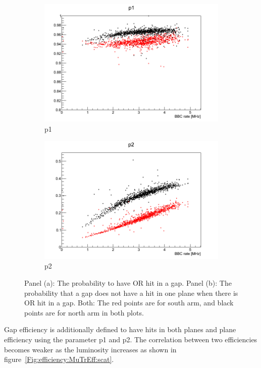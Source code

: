 \begin{figure}
  \centering
	\begin{subfigure}{0.5\textwidth}
		\centering
		\includegraphics[width=0.9\linewidth]{./figures/mutr_hiteff_run13_p1.png}
		\caption{p1}
	\end{subfigure}%
	\begin{subfigure}{0.5\textwidth}
		\centering
		\includegraphics[width=0.9\linewidth]{./figures/mutr_hiteff_run13_p2.png}
    \caption{p2}
	\end{subfigure}
  \caption{
    Panel (a): The probability to have OR hit in a gap. Panel (b): The
    probability that a gap does not have a hit in one plane when there is OR hit
    in a gap. Both: The red points are for south arm, and black points are for
    north arm in both plots.
  }
  \label{Fig:efficiency:MuTrEff:hitprob}
\end{figure}

Gap efficiency is additionally defined to have hits in both planes and plane
efficiency using the parameter p1 and p2. The correlation between two
efficiencies becomes weaker as the luminosity increases as shown in
figure~\ref{Fig:efficiency:MuTrEff:scat}.


